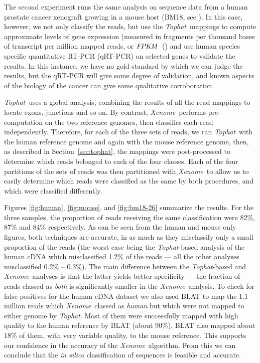 \documentclass{bioinfo}
\newcommand{\Xenome}{\textit{Xenome}{}}
\newcommand{\Tophat}{\textit{Tophat}{}}
\newcommand{\fpkm}{\ensuremath{\hbox{\textit{FPKM}}}{}}
\begin{document}
The second experiment runs the same analysis on
sequence data from a human prostate cancer xenograft growing in a mouse host (BM18, see \cite{MCCULLOCH:2005p18715}).
In this case, however, we not only classify
the reads, but use the \Tophat\ mappings to compute approximate
levels of gene expression (measured in fragments per thousand bases of
transcript per million mapped reads, or \fpkm\ (\cite{trapnell2010}) and
use human species specific quantitative RT-PCR (qRT-PCR) on
selected genes to validate the results.  In this instance, we have no
gold standard by which we can judge the results, but the qRT-PCR will
give some degree of validation, and known aspects of the biology of the
cancer can give some qualitative corroboration.

\Tophat\ uses a global analysis, combining the results of all the read mappings to
locate exons, junctions and so on. By contrast, \Xenome\ performs
pre-computation on the two reference genomes, then classifies each
read independently.
Therefore, for each of the three sets of reads, we ran \Tophat\ with
the human reference genome and again with the mouse reference
genome, then, as described in Section~\ref{sec:tophat}, the mappings
were post-processed to determine which reads belonged to each of the
four classes.  Each of the four partitions of the sets of reads was
then partitioned with \Xenome\ to allow us to easily determine
which reads were classified as the same by both procedures, and which were
classified differently.

Figures \ref{fig:human}, \ref{fig:mouse}, and \ref{fig:bm18-26}
summarize the results.  For the three samples, the proportion of reads
receiving the same classification were 82\%, 87\% and 84\% respectively.
As can be seen from the human and mouse only figures, both techniques
are accurate, in as much as they misclassify only a small proportion of
the reads (the worst case being the \Tophat-based analysis of
the human cDNA which misclassified 1.2\% of the reads --- all the other
analyses misclassified 0.2\% -- 0.3\%).  The main difference between
the \Tophat-based and \Xenome\ analyses is that the
latter yields better specificity --- the fraction of reads classed as
\textit{both} is significantly smaller in the \Xenome\ analysis.
To check for false positives for the human cDNA dataset we also used BLAT \citep{kent2002blat} to map the 1.1 million reads which
\Xenome\ classed as \textit{human} but which were not mapped to either genome by \Tophat.
Most of them were successfully mapped with high quality to the human reference by BLAT (about 90\%).
BLAT also mapped about 18\% of them, with very variable quality,  to the mouse reference.
This supports our confidence in the accuracy of the \Xenome\ algorithm.
From this we can conclude that the \textit{in silico} classification of
sequences is feasible and accurate.
\end{document}
